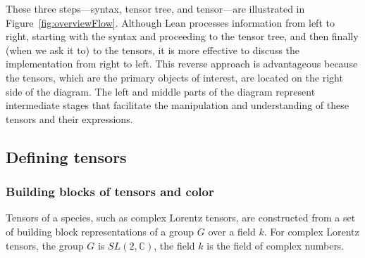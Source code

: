 \documentclass[a4paper, 11pt]{article}
\begin{document}
These three steps—syntax, tensor tree, and tensor—are illustrated in Figure~\ref{fig:overviewFlow}. 
Although Lean processes information from left to right, 
starting with the syntax and proceeding to the tensor tree, and then finally (when 
we ask it to) to the tensors, 
it is more effective to discuss the implementation from right to left. 
This reverse approach is advantageous because the tensors,
 which are the primary objects of interest, are located on the right side of the diagram. 
 The left and middle parts of the diagram represent intermediate stages that facilitate the 
 manipulation and understanding of these tensors and their expressions.

\subsection{Defining tensors}

\subsubsection{Building blocks of tensors and color}

Tensors of a species, such as complex Lorentz tensors, are constructed from a 
set of building block representations of a group $G$ over a field $k$.
For complex Lorentz tensors, the group $G$ is $SL(2, \mathbb{C})$, the field $k$ is the 
field of complex numbers. 
\end{document}
